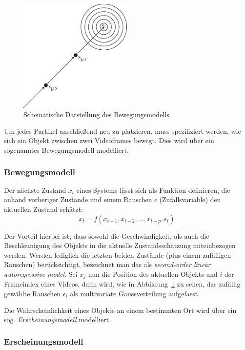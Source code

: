 \documentclass[a4paper, 11pt, twocolumn]{article}
\begin{document}
\begin{figure}
	\centering
	\includegraphics[width=0.5\textwidth]{bewegungsmodell.eps}
	\caption{Schematische Darstellung des Bewegungsmodells}
	\label{fig:bewegungsmodell}
\end{figure}

Um jedes Partikel anschließend neu zu platzieren, muss spezifiziert werden, wie sich ein Objekt zwischen zwei Videoframes bewegt. Dies wird über ein sogenanntes Bewegungsmodell modelliert.

\subsubsection{Bewegungsmodell} %
\label{ssub:bewegungsmodell}

Der nächste Zustand $x_t$ eines Systems lässt sich als Funktion definieren, die anhand vorheriger Zustände und einem Rauschen $\epsilon$ (Zufallsvariable) den aktuellen Zustand schätzt:
\[
	x_t = f(x_{t-1}, x_{t-2}, \ldots, x_{t-p}, \epsilon_t)
\]

Der Vorteil hierbei ist, dass sowohl die Geschwindigkeit, als auch die Beschleunigung des Objekts in die aktuelle Zustandsschätzung miteinbezogen werden. 
Werden lediglich die letzten beiden Zustände (plus einem zufälligen Rauschen) berücksichtigt, bezeichnet man das als \emph{second-order linear autoregressive model}.
Sei $x_j$ nun die Position des aktuellen Objekts und $i$ der Frameindex eines Videos, dann wird, wie in Abbildung~\ref{fig:bewegungsmodell} zu sehen, das zufällig gewählte Rauschen $\epsilon_i$ als multivariate Gaussverteilung aufgefasst.


Die Wahrscheinlichkeit eines Objekts an einem bestimmten Ort wird über ein sog. \emph{Erscheinungsmodell} modelliert.

\subsubsection{Erscheinungsmodell} %
\label{ssub:erscheinungsmodell}
\end{document}
